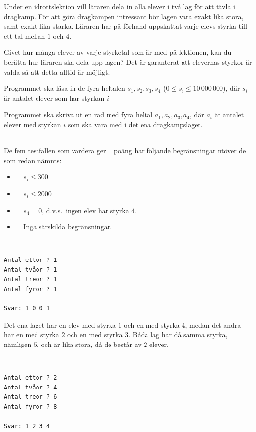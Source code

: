 \newpage
{}

Under en idrottslektion vill läraren dela in alla elever i två lag för att tävla i dragkamp.
För att göra dragkampen intressant bör lagen vara exakt lika stora, samt exakt lika starka.
Läraren har på förhand uppskattat varje elevs styrka till ett tal mellan $1$ och $4$.

Givet hur många elever av varje styrketal som är med på lektionen, kan du berätta hur läraren ska dela upp lagen?
Det är garanterat att elevernas styrkor är valda så att detta alltid är möjligt.

Programmet ska läsa in de fyra heltalen $s_1, s_2, s_3, s_4$ ($0 \le s_i \le 10\,000\,000$), där $s_i$ är antalet elever som har styrkan $i$. 

Programmet ska skriva ut en rad med fyra heltal $a_1, a_2, a_3, a_4$, där $a_i$ är antalet elever med styrkan $i$ som ska vara med i det ena dragkampslaget.

\vspace{0.5cm}
\\
De fem testfallen som vardera ger $1$ poäng har följande begränsningar utöver de som redan nämnts:
\begin{itemize}
    \item[(1)] $\;\;\;\;s_i \le 300$    
    \item[(2)] $\;\;\;\;s_i \le 2000$ 
    \item[(3)] $\;\;\;\;s_4=0$, d.v.s.\ ingen elev har styrka $4$.
    \item[(4-5)] $\;\;\;\; $Inga särskilda begränsningar.
\end{itemize}

\vspace{1cm}
\\
\begin{verbatim}
Antal ettor ? 1
Antal tvåor ? 1
Antal treor ? 1
Antal fyror ? 1

Svar: 1 0 0 1
\end{verbatim}

Det ena laget har en elev med styrka $1$ och en med styrka $4$, medan det andra har en med styrka $2$ och en med styrka $3$.
Båda lag har då samma styrka, nämligen $5$, och är lika stora, då de består av $2$ elever.

\\
\begin{verbatim}
Antal ettor ? 2
Antal tvåor ? 4
Antal treor ? 6
Antal fyror ? 8

Svar: 1 2 3 4
\end{verbatim}


